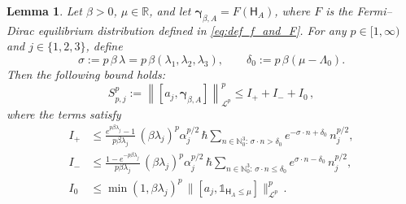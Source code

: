 \documentclass[11pt]{amsart}
\theoremstyle{plain}
\newtheorem{lem}[theorem]{Lemma}
\theoremstyle{definition}
\newcommand		{\N}		{\mathbb N}			%
\newcommand		{\RR}		{\mathbb R}			%
\newcommand		{\R}		{\RR}
\renewcommand	{\L}		{\mathcal L}		%
\newcommand		\sfH		{\mathsf H}			%
\newcommand		{\lt}			{\left}				%
\newcommand		{\rt}			{\right}			%
\renewcommand	{\(}			{\lt(}
\renewcommand	{\)}			{\rt)}
\newcommand		{\com}[1]		{\lt[{#1}\rt]}		%
\newcommand		{\nrm}[1]		{\lt\lVert #1\rt\rVert}
\newcommand		{\Nrm}[2]		{\nrm{#1}_{#2}}
\newcommand		{\indic}	{\mathds{1}}		%
\newcommand		{\opgam}	{{\boldsymbol{\gamma}}}	%
\begin{document}
    \begin{lem}\label{lem:magnetic_Spp_decomposition}
        Let $\beta>0$, $\mu\in\R$, and let $\opgam_{\beta,A}=F(\sfH_A)$, where $F$ is the Fermi--Dirac equilibrium distribution defined in \eqref{eq:def_f_and_F}. 
        For any $p\in[1,\infty)$ and $j\in\{1,2,3\}$, define
        \begin{equation}\label{def:sigma_delta}
            \sigma := p\,\beta\,\lambda = p\,\beta \lt(\lambda_1,\lambda_2,\lambda_3\rt), \qquad 
            \delta_0 := p\,\beta \lt(\mu-\Lambda_0\rt).
        \end{equation}
        Then the following bound holds:
        \begin{equation*}
            S_{p,j}^p := \Nrm{\com{a_j,\opgam_{\beta,A}}}{\L^p}^p \le I_+ + I_- + I_0\,,
        \end{equation*}
        where the terms satisfy
        \begin{align*}
            I_+ &\le \frac{e^{p\beta\lambda_j}-1}{p\beta\lambda_j}\, (\beta\lambda_j)^p \alpha_j^{p/2}\, \hbar 
            \sum_{n\in\N_0^3:\, \sigma\cdot n > \delta_0} e^{-\sigma\cdot n + \delta_0}\, n_j^{p/2}, \\[4pt]
            I_- &\le \frac{1-e^{-p\beta\lambda_j}}{p\beta\lambda_j}\, (\beta\lambda_j)^p \alpha_j^{p/2}\, \hbar 
            \sum_{n\in\N_0^3:\, \sigma\cdot n \le \delta_0} e^{\sigma\cdot n - \delta_0}\, n_j^{p/2}, \\[4pt]
            I_0 &\le \min(1,\beta\lambda_j)^p \,\bigl\|\com{a_j,\indic_{\sfH_A\le\mu}}\bigr\|_{\L^p}^p \, .
        \end{align*}
    \end{lem}
    
\end{document}
